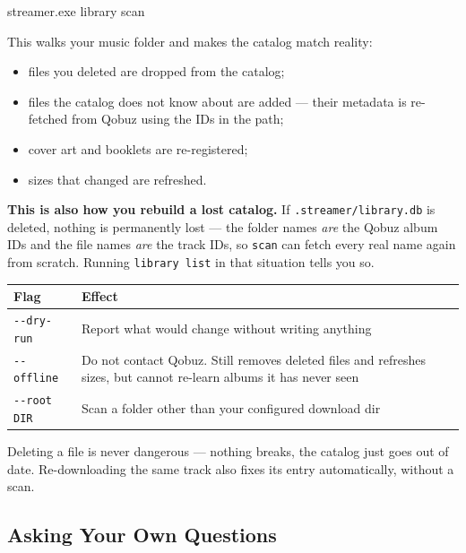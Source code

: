 \documentclass[11pt,a4paper]{article}
\begin{document}
\begin{cmdbox}
streamer.exe library scan
\end{cmdbox}

This walks your music folder and makes the catalog match reality:

\begin{itemize}
  \item files you deleted are dropped from the catalog;
  \item files the catalog does not know about are added --- their metadata is
        re-fetched from Qobuz using the IDs in the path;
  \item cover art and booklets are re-registered;
  \item sizes that changed are refreshed.
\end{itemize}

\textbf{This is also how you rebuild a lost catalog.}  If
\texttt{.streamer/library.db} is deleted, nothing is permanently lost --- the
folder names \emph{are} the Qobuz album IDs and the file names \emph{are} the
track IDs, so \texttt{scan} can fetch every real name again from scratch.
Running \texttt{library list} in that situation tells you so.

\begin{center}
\begin{tabularx}{\linewidth}{@{}l X@{}}
\toprule
\textbf{Flag} & \textbf{Effect} \\
\midrule
\texttt{-{}-dry-run} & Report what would change without writing anything \\
\texttt{-{}-offline} & Do not contact Qobuz.  Still removes deleted files and
                       refreshes sizes, but cannot re-learn albums it has
                       never seen \\
\texttt{-{}-root DIR} & Scan a folder other than your configured download dir \\
\bottomrule
\end{tabularx}
\end{center}

\begin{tipbox}
Deleting a file is never dangerous --- nothing breaks, the catalog just goes
out of date.  Re-downloading the same track also fixes its entry
automatically, without a scan.
\end{tipbox}

\subsection{Asking Your Own Questions}
\end{document}
